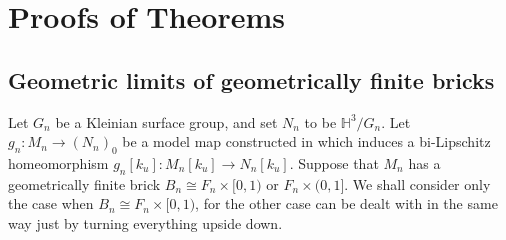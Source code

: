 \documentclass{amsart}
\newtheorem{lemma}[theorem]{Lemma}
\newtheorem{prop}[theorem]{Proposition}
\theoremstyle{definition}
\numberwithin{figure}{section}
\numberwithin{equation}{section}
\newcommand{\blackboard}[1]{\ensuremath{\mathbb{#1}}}
\newcommand{\hyperbolic}{\blackboard{H}}
\def\ck{\mathcal{K}}
\def\cv{\mathcal{V}}
\def\part{\partial}
\begin{document}



%

%

%

%

\section{Proofs of Theorems}\label{S_Proofs}

\subsection{Geometric limits of geometrically finite bricks}\label{geom_finite}
Let $G_n$ be a Kleinian surface group, and set $N_n$ to be $\hyperbolic^3/G_n$.
Let $g_n: M_n \rightarrow (N_n)_0$ be a model map constructed in \cite{bcm} which induces a bi-Lipschitz homeomorphism $g_n[k_u]: M_n[k_u] \rightarrow N_n[k_u]$.
Suppose that $M_n$ has a geometrically finite brick $B_n \cong F_n \times [0,1)$ or $F_n \times (0,1]$.
We shall consider only the case when $B_n \cong F_n \times [0,1)$, for the other case can be dealt with in the same way just by turning everything upside down.
\end{document}
